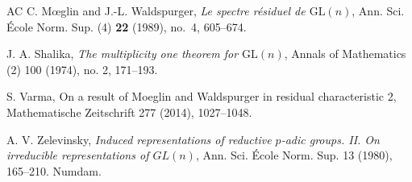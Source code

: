 \documentclass[11pt]{amsart}
\theoremstyle{definition}
\numberwithin{equation}{section}
\begin{document}
\begin{thebibliography}{AC}
		C. M{\oe}glin and J.-L. Waldspurger,
		\textit{Le spectre r\'esiduel de $\mathrm{GL}(n)$},
		Ann. Sci. \'{E}cole Norm. Sup. (4)
		\textbf{22} (1989), no.~4, 605--674.

        J. A. Shalika, \textit{The multiplicity one theorem for \(\mathrm{GL}(n)\)}, Annals of Mathematics (2) 100 (1974), no. 2, 171–193.
		
		
		
		 S. Varma, On a result of Moeglin and Waldspurger in residual characteristic 2, Mathematische Zeitschrift 277 (2014), 1027–1048.
		
		
		
		
		A. V. Zelevinsky, \textit{Induced representations of reductive \(p\)-adic groups. II. On irreducible representations of \(GL(n)\)}, Ann. Sci. École Norm. Sup. 13 (1980), 165–210. Numdam.
		
		
		
		


		
		
		

		
		
		
		
		

		

		
		


		
		
	\end{thebibliography}
	
	
\end{document}
